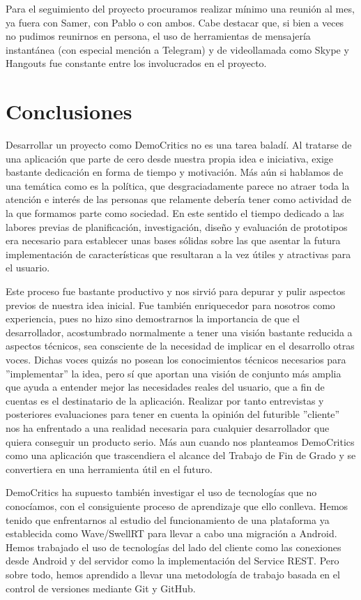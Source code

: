 Para el seguimiento del proyecto procuramos realizar mínimo una reunión al mes, ya fuera con Samer, con Pablo o con ambos. Cabe destacar que, si bien a veces no pudimos reunirnos en persona, el uso de herramientas de mensajería instantánea (con especial mención a Telegram) y de videollamada como Skype y Hangouts fue constante entre los involucrados en el proyecto.

\section{Conclusiones}

Desarrollar un proyecto como DemoCritics no es una tarea baladí. Al tratarse de una aplicación que parte de cero desde nuestra propia idea e iniciativa, exige bastante dedicación en forma de tiempo y motivación. Más aún si hablamos de una temática como es la política, que desgraciadamente parece no atraer toda la atención e interés de las personas que relamente debería tener como actividad de la que formamos parte como sociedad. En este sentido el tiempo dedicado a las labores previas de planificación, investigación, diseño y evaluación de prototipos era necesario para establecer unas bases sólidas sobre las que asentar la futura implementación de características que resultaran a la vez útiles y atractivas para el usuario.

Este proceso fue bastante productivo y nos sirvió para depurar y pulir aspectos previos de nuestra idea inicial. Fue también enriquecedor para nosotros como experiencia, pues no hizo sino demostrarnos la importancia de que el desarrollador, acostumbrado normalmente a tener una visión   bastante reducida a aspectos técnicos, sea consciente de la necesidad de implicar en el desarrollo otras voces. Dichas voces quizás no posean los conocimientos técnicos necesarios para ''implementar'' la idea, pero sí que aportan una visión de conjunto más amplia que ayuda a entender mejor las necesidades reales del usuario, que a fin de cuentas es el destinatario de la aplicación. Realizar por tanto entrevistas y posteriores evaluaciones para tener en cuenta la opinión del futurible ''cliente'' nos ha enfrentado a una realidad necesaria para cualquier desarrollador que quiera conseguir un producto serio. Más aun cuando nos planteamos DemoCritics como una aplicación que trascendiera el alcance del Trabajo de Fin de Grado y se convertiera en una herramienta útil en el futuro.

DemoCritics ha supuesto también investigar el uso de tecnologías que no conocíamos, con el consiguiente proceso de aprendizaje que ello conlleva. Hemos tenido que enfrentarnos al estudio del funcionamiento de una plataforma ya establecida como Wave/SwellRT para llevar a cabo una migración a Android. Hemos trabajado el uso de tecnologías del lado del cliente como las conexiones desde Android y del servidor como la implementación del Service REST. Pero sobre todo, hemos aprendido a llevar una metodología de trabajo basada en el control de versiones mediante Git y GitHub.

